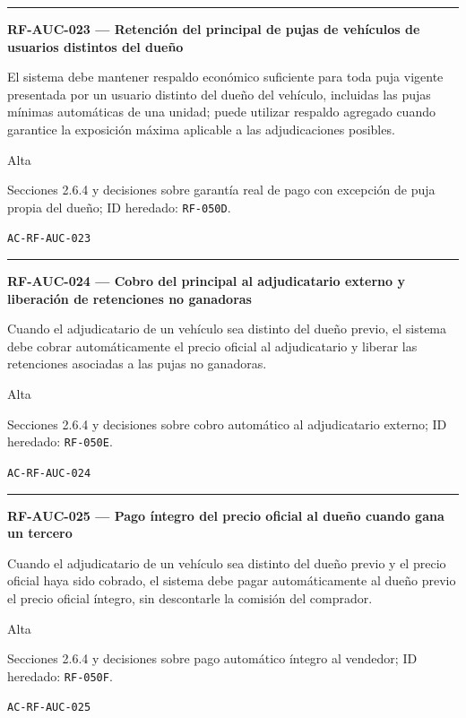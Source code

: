 \documentclass[10pt,letterpaper]{article}
\begin{document}
\vspace{0.25em}\hrule\vspace{0.65em}
\noindent\textbf{RF-AUC-023 --- Retención del principal de pujas de vehículos de usuarios distintos del dueño}\par
\begin{description}[style=nextline,leftmargin=3.15cm,labelwidth=2.8cm,font=\normalfont\bfseries]
\item[Obligación] El sistema debe mantener respaldo económico suficiente para toda puja vigente presentada por un usuario distinto del dueño del vehículo, incluidas las pujas mínimas automáticas de una unidad; puede utilizar respaldo agregado cuando garantice la exposición máxima aplicable a las adjudicaciones posibles.
\item[Prioridad] Alta
\item[Procedencia] Secciones 2.6.4 y decisiones sobre garantía real de pago con excepción de puja propia del dueño; ID heredado: \texttt{RF-050D}.
\item[Verificación] \texttt{AC-RF-AUC-023}
\end{description}
\vspace{0.25em}\hrule\vspace{0.65em}
\noindent\textbf{RF-AUC-024 --- Cobro del principal al adjudicatario externo y liberación de retenciones no ganadoras}\par
\begin{description}[style=nextline,leftmargin=3.15cm,labelwidth=2.8cm,font=\normalfont\bfseries]
\item[Obligación] Cuando el adjudicatario de un vehículo sea distinto del dueño previo, el sistema debe cobrar automáticamente el precio oficial al adjudicatario y liberar las retenciones asociadas a las pujas no ganadoras.
\item[Prioridad] Alta
\item[Procedencia] Secciones 2.6.4 y decisiones sobre cobro automático al adjudicatario externo; ID heredado: \texttt{RF-050E}.
\item[Verificación] \texttt{AC-RF-AUC-024}
\end{description}
\vspace{0.25em}\hrule\vspace{0.65em}
\noindent\textbf{RF-AUC-025 --- Pago íntegro del precio oficial al dueño cuando gana un tercero}\par
\begin{description}[style=nextline,leftmargin=3.15cm,labelwidth=2.8cm,font=\normalfont\bfseries]
\item[Obligación] Cuando el adjudicatario de un vehículo sea distinto del dueño previo y el precio oficial haya sido cobrado, el sistema debe pagar automáticamente al dueño previo el precio oficial íntegro, sin descontarle la comisión del comprador.
\item[Prioridad] Alta
\item[Procedencia] Secciones 2.6.4 y decisiones sobre pago automático íntegro al vendedor; ID heredado: \texttt{RF-050F}.
\item[Verificación] \texttt{AC-RF-AUC-025}
\end{description}
\end{document}
